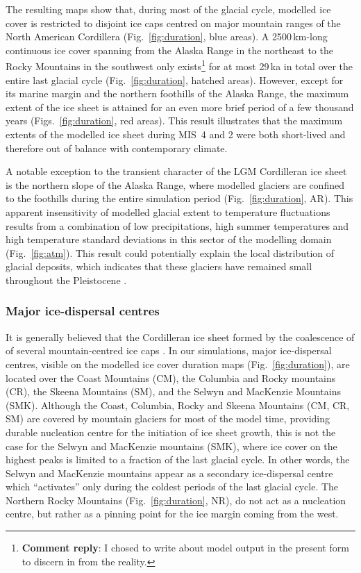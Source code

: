 \documentclass[tc, manuscript]{copernicus}
\newcommand{\renote}[1]{\footnote{\textbf{Comment reply}: #1}}
\begin{document}
The resulting maps show that, during most of the glacial cycle, modelled ice
cover is restricted to disjoint ice caps centred on major mountain ranges of
the North American Cordillera (Fig.~\ref{fig:duration}, blue areas). A
2500\,km-long continuous ice cover spanning from the Alaska Range in the
northeast to the Rocky Mountains in the southwest only exists\renote{
    I chosed to write about model output in the present form to discern in from
    the reality.}
for at most 29\,ka in total over the entire last glacial cycle
(Fig.~\ref{fig:duration}, hatched areas). However,
except for its marine margin and the northern foothills of the Alaska Range,
the maximum extent of the ice sheet is attained for an even more brief period
of a few thousand years (Figs.~\ref{fig:duration}, red areas). This
result illustrates that the maximum extents of the modelled ice sheet during
MIS~4 and 2 were both short-lived and therefore out of balance with
contemporary climate.

A notable exception to the transient character of the LGM Cordilleran ice sheet
is the northern slope of the Alaska Range, where modelled glaciers are confined
to the foothills during the entire simulation period (Fig.~\ref{fig:duration},
AR). This apparent insensitivity of modelled glacial extent to temperature
fluctuations results from a combination of low precipitations, high summer
temperatures and high temperature standard deviations in this sector of the
modelling domain (Fig.~\ref{fig:atm}). This result could potentially explain
the local distribution of glacial deposits, which indicates that these glaciers
have remained small throughout the Pleistocene \citep{Kaufman.Manley.2004}.

\subsubsection{Major ice-dispersal centres}

It is generally believed that the Cordilleran ice sheet formed by the
coalescence of of several mountain-centred ice caps \citep{Davis.Mathews.1944}.
In our simulations, major ice-dispersal centres, visible on the modelled ice
cover duration maps (Fig.~\ref{fig:duration}), are located over the Coast
Mountains (CM), the Columbia and Rocky mountains (CR), the Skeena Mountains
(SM), and the Selwyn and MacKenzie Mountains (SMK). Although the Coast,
Columbia, Rocky and Skeena Mountains (CM, CR, SM) are covered by mountain
glaciers for most of the model time, providing durable nucleation centre for
the initiation of ice sheet growth, this is not the case for the Selwyn and
MacKenzie mountains (SMK), where ice cover on the highest peaks is limited to a
fraction of the last glacial cycle. In other words, the Selwyn and MacKenzie
mountains appear as a secondary ice-dispersal centre which ``activates'' only
during the coldest periods of the last glacial cycle. The Northern Rocky
Mountains (Fig.~\ref{fig:duration}, NR), do not act as a nucleation centre,
but rather as a pinning point for the ice margin coming from the west.
\end{document}
